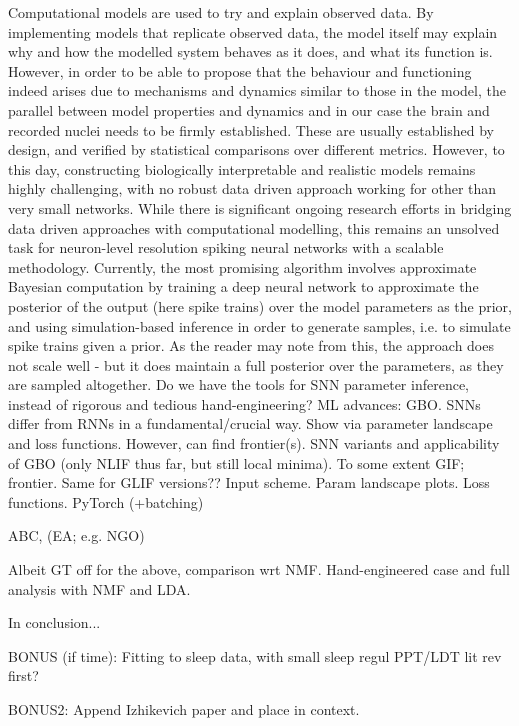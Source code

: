 \documentclass[mphil,deptreport,ai]{infthesis} %
\begin{document}
\begin{preliminary}
{%
Computational models are used to try and explain observed data.
By implementing models that replicate observed data, the model itself may explain why and how the modelled system behaves as it does, and what its function is.
However, in order to be able to propose that the behaviour and functioning indeed arises due to mechanisms and dynamics similar to those in the model, the parallel between model properties and dynamics and in our case the brain and recorded nuclei needs to be firmly established.
These are usually established by design, and verified by statistical comparisons over different metrics.
However, to this day, constructing biologically interpretable and realistic models remains highly challenging, with no robust data driven approach working for other than very small networks.
While there is significant ongoing research efforts in bridging data driven approaches with computational modelling, this remains an unsolved task for neuron-level resolution spiking neural networks with a scalable methodology.
Currently, the most promising algorithm involves approximate Bayesian computation by training a deep neural network to approximate the posterior of the output (here spike trains) over the model parameters as the prior, and using simulation-based inference in order to generate samples, i.e. to simulate spike trains given a prior.
As the reader may note from this, the approach does not scale well - but it does maintain a full posterior over the parameters, as they are sampled altogether.
Do we have the tools for SNN parameter inference, instead of rigorous and tedious hand-engineering?
ML advances: GBO.
SNNs differ from RNNs in a fundamental/crucial way. Show via parameter landscape and loss functions.
However, can find frontier(s).
SNN variants and applicability of GBO (only NLIF thus far, but still local minima).
To some extent GIF; frontier.
Same for GLIF versions??
Input scheme. Param landscape plots.
Loss functions.
PyTorch (+batching)

ABC, (EA; e.g. NGO)

Albeit GT off for the above, comparison wrt NMF.
Hand-engineered case and full analysis with NMF and LDA.

In conclusion...

BONUS (if time): Fitting to sleep data, with small sleep regul PPT/LDT lit rev first?

BONUS2: Append Izhikevich paper and place in context.

}
\end{preliminary}
\end{document}
